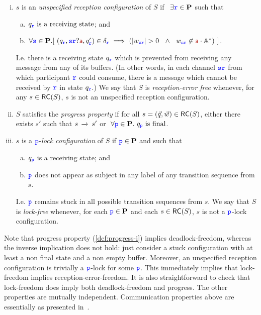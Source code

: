 \begin{definition}
\begin{enumerate}[i)]
\item
\label{def:safeness-ur}
$s$ is an {\em unspecified reception configuration} of $S$  if ~$\exists { \ensuremath{\mathtt{\color{blue}{ {r}}}} } \in\mathbf{P}$ such that  
\begin{enumerate}[a)]
\item
$q_{\mathtt{\color{blue}{ {r}}}} \text{ is a receiving state}$; and
\item
$\forall\tts\in\roles.[~(q_\ttr,\tts\ttr?\msg[a],q'_\ttr)\in\delta_\ttr  \implies
(|w_{\tts\ttr}| > 0~~\wedge~~ w_{\tts\ttr}\not\in  \msg[a]\cdot\mathbb{A}^*)~ ]$.
\end{enumerate}
I.e. there is a receiving  state $q_{\mathtt{\color{blue}{ {r}}}}$ 
which is prevented from
receiving any message from any of its buffers.
(In other words, in each channel ${\mathtt{\color{blue}{ {s}}}}{\mathtt{\color{blue}{ {r}}}}$ from which participant ${\mathtt{\color{blue}{ {r}}}}$ could consume, there
is a message which cannot be received by ${\mathtt{\color{blue}{ {r}}}}$ in state $q_{\mathtt{\color{blue}{ {r}}}}$.)
We say that $S$ is {\em reception-error free} whenever, for any $s\in \mathsf{RC}(S)$, $s$ is not an unspecified reception configuration.
\item
\label{def:progress-i}
$S$ satisfies the {\em progress property} if for all $s= (\vec{q},\vec{w}) \in \mathsf{RC}(S)$, either there exists $s'$ such that $s\,\xrightarrow{}_{{}}\, s'$
or $~\forall { \ensuremath{\mathtt{\color{blue}{ {p}}}} }\in\mathbf{P}. ~ q_{\mathtt{\color{blue}{ {p}}}} \text{ is final}$. 
\item
\label{def:lock-freedom}
$s$ is a ${\mathtt{\color{blue}{ {p}}}}$-{\em lock configuration} of $S$ if ${\mathtt{\color{blue}{ {p}}}}\in\mathbf{P}$ and such that
\begin{enumerate}[a)]
\item
$q_{{\mathtt{\color{blue}{ {p}}}}}$ is a receiving state; and
\item 
 ${\mathtt{\color{blue}{ {p}}}}$ does not appear as subject in any label of any transition sequence from $s$.
\end{enumerate}
I.e. ${\mathtt{\color{blue}{ {p}}}}$ remains stuck in all possible transition sequences from $s$.
We say that $S$ is {\em lock-free} whenever, for each ${\mathtt{\color{blue}{ {p}}}}\in\mathbf{P}$ and each $s\in \mathsf{RC}(S)$, $s$ is not a ${\mathtt{\color{blue}{ {p}}}}$-lock configuration.
\end{enumerate}
\end{definition}

Note that progress property (\ref{def:progress-i}) implies deadlock-freedom, whereas the inverse implication does not hold: just consider a stuck configuration with at least a non final state and a non empty buffer.
Moreover, an unspecified reception configuration is trivially a ${\mathtt{\color{blue}{ {p}}}}$-lock for some 
${\mathtt{\color{blue}{ {p}}}}$. This immediately implies that lock-freedom implies
reception-error-freedom.
It is also straightforward to check that lock-freedom does imply  both  deadlock-freedom
 and progress. 
The other properties are mutually independent. 
 Communication properties above are essentially as presented in~\cite{DY12,TY15,CF05,BZ83,DY12}. 

